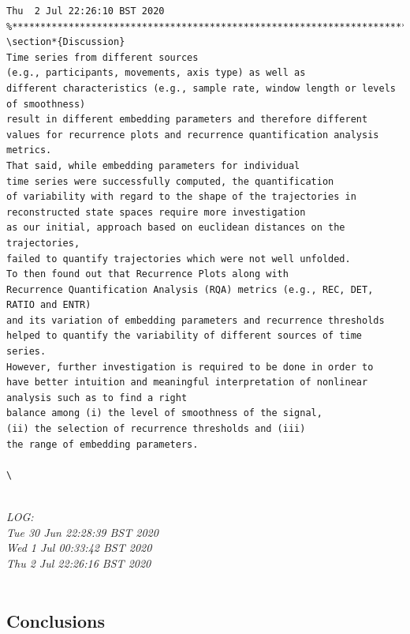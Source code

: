 \documentclass[10pt]{article}
\begin{document}
\begin{enumerate}
\begin{verbatim}
Thu  2 Jul 22:26:10 BST 2020
%*******************************************************************************
\section*{Discussion}
Time series from different sources  
(e.g., participants, movements, axis type) as well as
different characteristics (e.g., sample rate, window length or levels of smoothness) 
result in different embedding parameters and therefore different 
values for recurrence plots and recurrence quantification analysis metrics.
That said, while embedding parameters for individual
time series were successfully computed, the quantification 
of variability with regard to the shape of the trajectories in 
reconstructed state spaces require more investigation
as our initial, approach based on euclidean distances on the trajectories, 
failed to quantify trajectories which were not well unfolded. 
To then found out that Recurrence Plots along with 
Recurrence Quantification Analysis (RQA) metrics (e.g., REC, DET, RATIO and ENTR) 
and its variation of embedding parameters and recurrence thresholds 
helped to quantify the variability of different sources of time series.
However, further investigation is required to be done in order to 
have better intuition and meaningful interpretation of nonlinear 
analysis such as to find a right 
balance among (i) the level of smoothness of the signal, 
(ii) the selection of recurrence thresholds and (iii) 
the range of embedding parameters. 

\


\end{verbatim}

	\textit{
	LOG: \\
	Tue 30 Jun 22:28:39 BST 2020 \\
	Wed  1 Jul 00:33:42 BST 2020 \\
	Thu  2 Jul 22:26:16 BST 2020 \\
	}
	\\




\end{enumerate}






\subsection{Conclusions}
\end{document}
